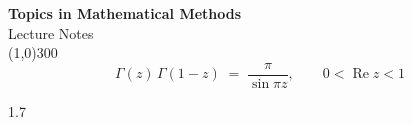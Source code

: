\documentclass[12pt,a4paper]{report}
\theoremstyle{definition}
\theoremstyle{plain}
\begin{document}
\begin{titlepage}
\begin{center}
\vspace*{3cm}
{\Huge\bfseries Topics in Mathematical Methods}\\[1.2cm]
{\large Lecture Notes}\\[2.5cm]
\line(1,0){300}\\[1.5cm]
$$\Gamma(z)\,\Gamma(1-z) \;=\; \frac{\pi}{\sin \pi z},
\qquad 0 < \operatorname{Re} z < 1$$
\end{center}
\end{titlepage}













\newpage
\begin{spacing}{1.7}
\tableofcontents
{}
\end{spacing}

\newpage

















\newpage
{}


\end{document}
